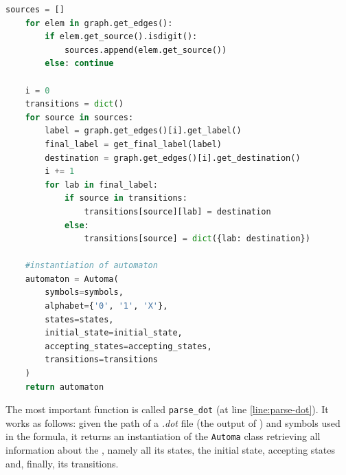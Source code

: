 \begin{lstlisting}[language=Python, style=Python, escapechar = £, label={code:janus-parser-automa}, caption={The \texttt{parserAutoma.py} module}]
    sources = []
    for elem in graph.get_edges():
        if elem.get_source().isdigit():
            sources.append(elem.get_source())
        else: continue

    i = 0
    transitions = dict()
    for source in sources:
        label = graph.get_edges()[i].get_label()
        final_label = get_final_label(label)
        destination = graph.get_edges()[i].get_destination()
        i += 1
        for lab in final_label:
            if source in transitions:
                transitions[source][lab] = destination
            else:
                transitions[source] = dict({lab: destination})

    #instantiation of automaton
    automaton = Automa(
        symbols=symbols,
        alphabet={'0', '1', 'X'},
        states=states,
        initial_state=initial_state,
        accepting_states=accepting_states,
        transitions=transitions
    )
    return automaton
\end{lstlisting}
The most important function is called \texttt{parse\_dot} (at line \ref{line:parse-dot}). It works as follows: given the path of a \textit{.dot} file (the output of \LTLfToDFA) and symbols used in the formula, it returns an instantiation of the \texttt{Automa} class retrieving all information about the \DFA, namely all its states, the initial state, accepting states and, finally, its transitions.

